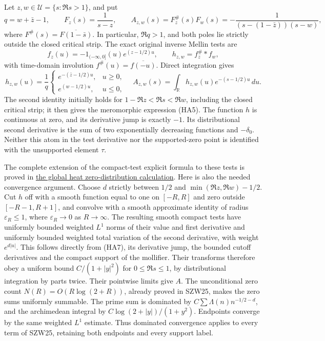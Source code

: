 \documentclass[
  10pt,
  a4paper,
]{article}
\begin{document}
Let \(z,w\in\mathcal U=\{s:\Re s>1\}\), and put \[
q=w+\bar z-1,\qquad F_z(s)=\frac1{s-z},\qquad
A_{z,w}(s)=F_z^\#(s)F_w(s)
=-\frac1{(s-(1-\bar z))(s-w)},
\tag{HA5}
\] where \(F^\#(s)=\overline{F(1-\bar s)}\). In particular, \(\Re q>1\),
and both poles lie strictly outside the closed critical strip. The exact
original inverse Mellin tests are \[
f_z(u)=-1_{(-\infty,0]}(u)e^{(z-1/2)u},\qquad
h_{z,w}=f_z^\#*f_w,
\tag{HA6}
\] with time-domain involution \(f^\#(u)=\overline{f(-u)}\). Direct
integration gives \[
h_{z,w}(u)=\frac1q
\begin{cases}
e^{-(\bar z-1/2)u},&u\ge0,\\
e^{(w-1/2)u},&u\le0,
\end{cases}
\quad
A_{z,w}(s)=\int_{\mathbb R}h_{z,w}(u)e^{-(s-1/2)u}\,du.
\tag{HA7}
\] The second identity initially holds for \(1-\Re z<\Re s<\Re w\),
including the closed critical strip; it then gives the meromorphic
expression (HA5). The function \(h\) is continuous at zero, and its
derivative jump is exactly \(-1\). Its distributional second derivative
is the sum of two exponentially decreasing functions and \(-\delta_0\).
Neither this atom in the test derivative nor the supported-zero point is
identified with the unsupported element \(\tau\).

The complete extension of the compact-test explicit formula to these
tests is proved in \href{ACTUAL_HEAT_ZERO_DISTRIBUTION_VARIATION.md}{the
global heat zero-distribution calculation}. Here is also the needed
convergence argument. Choose \(d\) strictly between \(1/2\) and
\(\min(\Re z,\Re w)-1/2\). Cut \(h\) off with a smooth function equal to
one on \([-R,R]\) and zero outside \([-R-1,R+1]\), and convolve with a
smooth approximate identity of radius \(\varepsilon_R\le1\), where
\(\varepsilon_R\to0\) as \(R\to\infty\). The resulting smooth compact
tests have uniformly bounded weighted \(L^1\) norms of their value and
first derivative and uniformly bounded weighted total variation of the
second derivative, with weight \(e^{d|u|}\). This follows directly from
(HA7), its derivative jump, the bounded cutoff derivatives and the
compact support of the mollifier. Their transforms therefore obey a
uniform bound \(C/(1+|y|^2)\) for \(0\le\Re s\le1\), by distributional
integration by parts twice. Their pointwise limits give \(A\). The
unconditional zero count \(N(R)=O(R\log(2+R))\), already proved in
SZW25, makes the zero sums uniformly summable. The prime sum is
dominated by \(C\sum\Lambda(n)n^{-1/2-d}\), and the archimedean integral
by \(C\log(2+|y|)/(1+y^2)\). Endpoints converge by the same weighted
\(L^1\) estimate. Thus dominated convergence applies to every term of
SZW25, retaining both endpoints and every support label.
\end{document}
